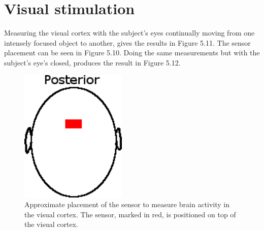 \section{Visual stimulation}
Measuring the visual cortex with the subject's eyes continually moving from one intensely focused object to another, gives the results in Figure 5.11. The sensor placement can be seen in Figure 5.10. Doing the same measurements but with the subject's eye's closed, produces the result in Figure 5.12.

\begin{figure}[htp]
\centering
\includegraphics[width=2in]{sensorback.png}
\caption[Placement of Sensor to Measure Visual Cortex]{Approximate placement of the sensor to measure brain activity in the visual cortex. The sensor, marked in red, is positioned on top of the visual cortex.}
\end{figure}

